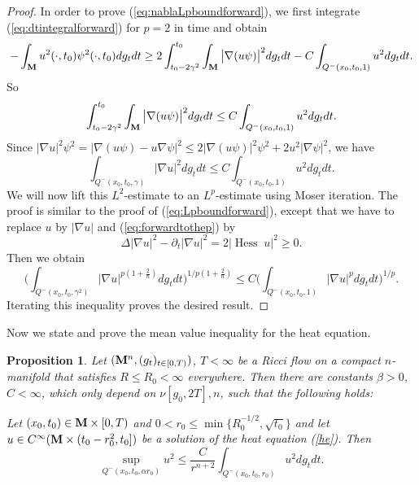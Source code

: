 \documentclass[11pt]{amsart}
\numberwithin{equation}{section}
\newtheorem{proposition}[theorem]{Proposition}
\def\a{\alpha}
\def\M{{\bf M}}
\def\d{\nabla}
\DeclareMathOperator{\Hess}{Hess}
\numberwithin{equation}{section}
\begin{document}
\begin{proof}
In order to prove (\ref{eq:nablaLpboundforward}), we first integrate (\ref{eq:dtintegralforward}) for $p = 2$ in time and obtain
\[  - \int_{\M} u^2 (\cdot, t_0) \psi^2 (\cdot, t_0) dg_t dt \geq 2 \int_{t_0 - 2 \gamma^2}^{t_0} \int_{\M} \big | \nabla (u \psi) \big|^2 dg_t dt - C \int_{Q^- (x_0, t_0, 1)} u^2 dg_t dt. \]
So
\[ \int_{t_0 - 2 \gamma^2}^{t_0} \int_{\M} \big | \nabla (u \psi) \big|^2 dg_t dt  \leq C \int_{Q^- (x_0, t_0, 1)} u^2 dg_t dt. \]
Since $| \nabla u  |^2 \psi^2 = | \nabla (u\psi) - u \nabla \psi |^2 \leq 2 |\nabla ( u \psi) |^2 \psi^2 + 2 u^2 |\nabla \psi |^2$, we have
\[ \int_{Q^- (x_0, t_0, \gamma )} |\nabla u |^2 dg_t dt \leq C \int_{Q^- (x_0, t_0, 1)} u^2 dg_t dt. \]
We will now lift this $L^2$-estimate to an $L^p$-estimate using Moser iteration.
The proof is similar to the proof of (\ref{eq:Lpboundforward}), except that we have to replace $u$ by $|\nabla u|$ and (\ref{eq:forwardtothep}) by
\[ \Delta |\d u|^2 - \partial_t |\d u|^2 = 2 | {\Hess} \; u|^2 \geq 0. \]
Then we obtain
\[ \bigg( \int_{Q^- (x_0, t_0, \gamma^2)} |\nabla u|^{p (1+ \frac2n)} dg_t dt \bigg)^{1/p(1+ \frac2n)} \leq C \bigg( \int_{Q^- (x_0, t_0, 1)} |\nabla u|^p dg_t dt \bigg)^{1/p}. \]
Iterating this inequality proves the desired result.
\end{proof}

Now we state and prove the mean value inequality for the heat equation.

\begin{proposition} \label{prHEmv}
Let $(\M^n, (g_t)_{t \in [0,T)})$, $T < \infty$ be a Ricci flow on a compact $n$-manifold that satisfies
$R \leq R_0 < \infty$ everywhere.
Then there are constants $\beta > 0$, $C < \infty$, which only depend on $\nu[g_0, 2T], n$, such that the following holds:

Let $(x_0, t_0) \in \M \times [0,T)$ and $0 < r_0 \leq \min \{ R_0^{-1/2}, \sqrt{t_0} \}$ and let $u \in C^\infty (\M \times ( t_0 - r_0^2 , t_0])$ be a solution of the heat equation (\ref{he}).
Then
\[ \sup_{Q^-(x_0, t_0, \a r_0)} u^2 \le \frac{C}{r^{n+2}} \int_{Q^-(x_0, t_0, r_0)} u^2 dg_t dt. \]
\end{proposition}
\end{document}

